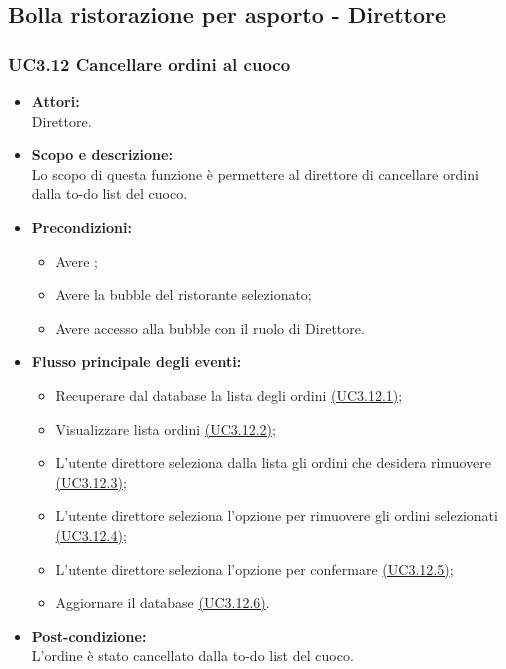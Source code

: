 \subsection{Bolla ristorazione per asporto - Direttore}

\subsubsection{UC3.12 Cancellare ordini al cuoco} \label{UC3.12}

\begin{itemize}
	\item \textbf{Attori:}
	\\Direttore.
	\item \textbf{Scopo e descrizione:} 
	\\Lo scopo di questa funzione è permettere al direttore di cancellare ordini dalla to-do list del cuoco.
	\item \textbf{Precondizioni:}
	\begin{itemize}
		\item Avere ;
		\item Avere la bubble del ristorante selezionato;
		\item Avere accesso alla bubble con il ruolo di Direttore.
	\end{itemize}
	\item \textbf{Flusso principale degli eventi:}
	\begin{itemize}
		\item Recuperare dal database la lista degli ordini \hyperref[UC3.12.1]{(UC3.12.1)};
		\item Visualizzare lista ordini \hyperref[UC3.12.2]{(UC3.12.2)};
		\item L’utente direttore seleziona dalla lista gli ordini che desidera rimuovere \hyperref[UC3.12.3]{(UC3.12.3)};
		\item L’utente direttore seleziona l’opzione per rimuovere gli ordini selezionati \hyperref[UC3.12.4]{(UC3.12.4)};
		\item L’utente direttore seleziona l’opzione per confermare \hyperref[UC3.12.5]{(UC3.12.5)};
		\item Aggiornare il database \hyperref[UC3.12.6]{(UC3.12.6)}.
	\end{itemize}
	\item \textbf{Post-condizione:}
	\\L’ordine è stato cancellato dalla to-do list del cuoco.
\end{itemize}

